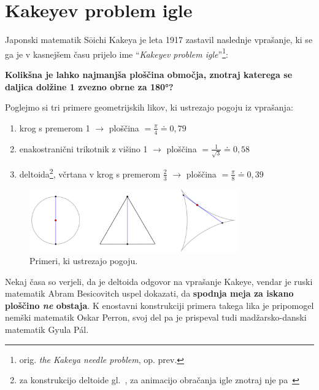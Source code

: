 \documentclass[a4paper, 12pt]{article}
\begin{document}
\newpage


\section*{Kakeyev problem igle}

Japonski matematik Sōichi Kakeya je leta 1917 zastavil naslednje vprašanje, ki se ga je v kasnejšem času prijelo ime ``\emph{Kakeyev problem igle}''\footnote{orig. \emph{the Kakeya needle problem}, op. prev.}:

\vspace{0.2cm}
\begin{center}
    \textbf{Kolikšna je lahko najmanjša ploščina območja, znotraj katerega se daljica dolžine 1 zvezno obrne za 180°?}
\end{center}
\vspace{0.2cm}

\noindent Poglejmo si tri primere geometrijskih likov, ki ustrezajo pogoju iz vprašanja:

\begin{enumerate}
    \item krog s premerom 1 $ \rightarrow $ ploščina $ = \frac{\pi}{4} \doteq 0{,}79 $
    \item enakostranični trikotnik z višino 1 $ \rightarrow $ ploščina $ = \frac{1}{\sqrt{3}} \doteq 0{,}58 $
    \item deltoida\footnote{za konstrukcijo deltoide gl.~\cite{deltoida}, za animacijo obračanja igle znotraj nje pa~\cite{kakeya_wiki}}, včrtana v krog s premerom $ \frac{2}{3} $ $ \rightarrow $ ploščina $ = \frac{\pi}{8} \doteq 0{,}39 $
\end{enumerate}

\begin{figure}[h!]
    \centering
    \includegraphics[width=0.8\textwidth]{geogebra_slike/prevelike_ploscine.png}
    \caption{Primeri, ki ustrezajo pogoju.}
    \label{primeri}
\end{figure}

Nekaj časa so verjeli, da je deltoida odgovor na vprašanje Kakeye, vendar je ruski matematik Abram Besicovitch uspel dokazati, da \textbf{spodnja meja za iskano ploščino \emph{ne} obstaja}. K enostavni konstrukciji primera takega lika je pripomogel nemški matematik Oskar Perron, svoj del pa je prispeval tudi madžarsko-danski matematik Gyula Pál.
\end{document}
